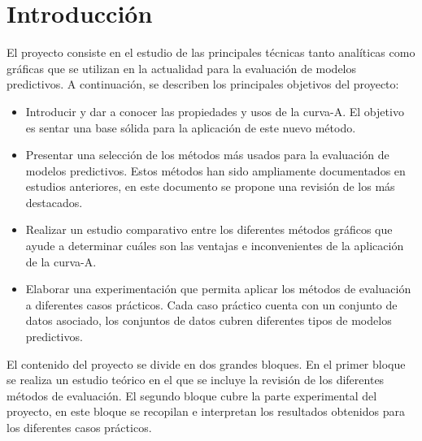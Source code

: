 \section{Introducción}

El proyecto consiste en el estudio de las principales técnicas tanto analíticas como gráficas que se utilizan en la actualidad para la evaluación de modelos predictivos. A continuación, se describen los principales objetivos del proyecto:

\bigbreak

\begin{itemize}
    \item Introducir y dar a conocer las propiedades y usos de la curva-A. El objetivo es sentar una base sólida para la aplicación de este nuevo método.
    \item Presentar una selección de los métodos más usados para la evaluación de modelos predictivos. Estos métodos han sido ampliamente documentados en estudios anteriores, en este documento se propone una revisión de los más destacados.
    \item Realizar un estudio comparativo entre los diferentes métodos gráficos que ayude a determinar cuáles son las ventajas e inconvenientes de la aplicación de la curva-A. 
    \item Elaborar una experimentación que permita aplicar los métodos de evaluación a diferentes casos prácticos. Cada caso práctico cuenta con un conjunto de datos asociado, los conjuntos de datos cubren diferentes tipos de modelos predictivos.
\end{itemize}

\bigbreak

El contenido del proyecto se divide en dos grandes bloques. En el primer bloque se realiza un estudio teórico en el que se incluye la revisión de los diferentes métodos de evaluación. El segundo bloque cubre la parte experimental del proyecto, en este bloque se recopilan e interpretan los resultados obtenidos para los diferentes casos prácticos.

\clearpage